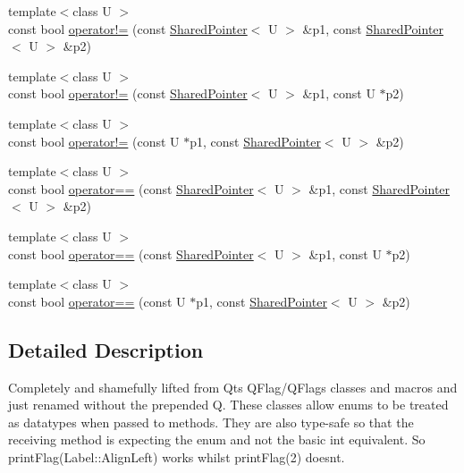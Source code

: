 \begin{DoxyCompactItemize}
\item 
{\footnotesize template$<$class U $>$ }\\const bool \hyperlink{namespaceprism_a9df924e4deb059bf1200701c8235410a}{operator!=} (const \hyperlink{classprism_1_1_shared_pointer}{Shared\+Pointer}$<$ U $>$ \&p1, const \hyperlink{classprism_1_1_shared_pointer}{Shared\+Pointer}$<$ U $>$ \&p2)
\item 
{\footnotesize template$<$class U $>$ }\\const bool \hyperlink{namespaceprism_ad6391c124e006b0e3a3ec67f55e208b0}{operator!=} (const \hyperlink{classprism_1_1_shared_pointer}{Shared\+Pointer}$<$ U $>$ \&p1, const U $\ast$p2)
\item 
{\footnotesize template$<$class U $>$ }\\const bool \hyperlink{namespaceprism_ab8792dbd5cac5678390843bacdb69daa}{operator!=} (const U $\ast$p1, const \hyperlink{classprism_1_1_shared_pointer}{Shared\+Pointer}$<$ U $>$ \&p2)
\item 
{\footnotesize template$<$class U $>$ }\\const bool \hyperlink{namespaceprism_ae53d52e8a36ec7ca58ea1731cc18f1d8}{operator==} (const \hyperlink{classprism_1_1_shared_pointer}{Shared\+Pointer}$<$ U $>$ \&p1, const \hyperlink{classprism_1_1_shared_pointer}{Shared\+Pointer}$<$ U $>$ \&p2)
\item 
{\footnotesize template$<$class U $>$ }\\const bool \hyperlink{namespaceprism_a2b73e87f080646696ed6b595a3900119}{operator==} (const \hyperlink{classprism_1_1_shared_pointer}{Shared\+Pointer}$<$ U $>$ \&p1, const U $\ast$p2)
\item 
{\footnotesize template$<$class U $>$ }\\const bool \hyperlink{namespaceprism_a1f29b22985dc0ec1fc548a551ce313ed}{operator==} (const U $\ast$p1, const \hyperlink{classprism_1_1_shared_pointer}{Shared\+Pointer}$<$ U $>$ \&p2)
\end{DoxyCompactItemize}


\subsection{Detailed Description}
Completely and shamefully lifted from Qt\textquotesingle{}s Q\+Flag/\+Q\+Flags classes and macros and just renamed without the prepended \textquotesingle{}Q\textquotesingle{}. These classes allow enums to be treated as datatypes when passed to methods. They are also type-\/safe so that the receiving method is expecting the enum and not the basic int equivalent. So print\+Flag(\+Label\+::\+Align\+Left) works whilst print\+Flag(2) doesn\textquotesingle{}t.

